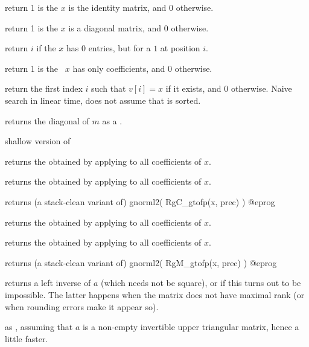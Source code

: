  return 1 is the  $x$ is the
identity matrix, and 0 otherwise.

 return 1 is the  $x$ is a
diagonal matrix, and 0 otherwise.

 return $i$ if the  $x$ has $0$ entries,
but for a $1$ at position $i$.

 return 1 is the ~$x$ has only
 coefficients, and 0 otherwise.

 return the first index $i$ such that
$v[i] = x$ if it exists, and $0$ otherwise. Naive search in linear time, does
not assume that  is sorted.

 returns the diagonal of $m$ as a .

 shallow version of 


 returns the  obtained by
applying  to all coefficients of $x$.

 returns the  obtained by
applying  to all coefficients of $x$.

 returns (a stack-clean variant of)
\bprog
  gnorml2( RgC_gtofp(x, prec) )
@eprog

 returns the  obtained by
applying  to all coefficients of $x$.

 returns the  obtained by
applying  to all coefficients of $x$.

 returns (a stack-clean variant of)
\bprog
  gnorml2( RgM_gtofp(x, prec) )
@eprog


 returns a left inverse of $a$ (which needs not be
square), or  if this turns out to be impossible. The latter
happens when the matrix does not have maximal rank (or when rounding errors
make it appear so).

 as , assuming that $a$ is a
non-empty invertible upper triangular matrix, hence a little faster.

